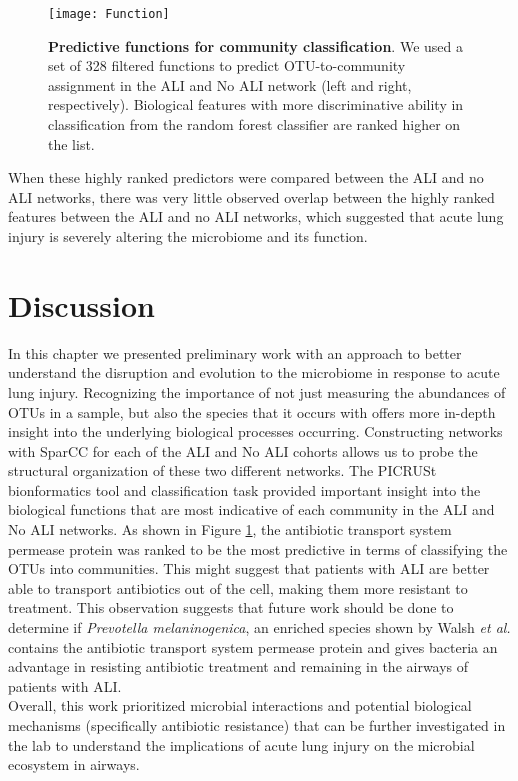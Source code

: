 \begin{figure}[h!]
\begin{center}
\texttt{[image: Function]}
\caption{{\bf Predictive functions for community classification}. We used a set of 328 filtered functions to predict OTU-to-community assignment in the ALI and No ALI network (left and right, respectively). Biological features with more discriminative ability in classification from the random forest classifier are ranked higher on the list.}
\label{Function}
\end{center}
\end{figure}

When these highly ranked predictors were compared between the ALI and no ALI networks, there was very little observed overlap between the highly ranked features between the ALI and no ALI networks, which suggested that acute lung injury is severely altering the microbiome and its function.

\section{Discussion}
\indent In this chapter we presented preliminary work with an approach to better understand the disruption and evolution to the microbiome in response to acute lung injury. Recognizing the importance of not just measuring the abundances of OTUs in a sample, but also the species that it occurs with offers more in-depth insight into the underlying biological processes occurring. Constructing networks with SparCC for each of the ALI and No ALI cohorts allows us to probe the structural organization of these two different networks. The PICRUSt bionformatics tool and classification task provided important insight into the biological functions that are most indicative of each community in the ALI and No ALI networks. As shown in Figure \ref{Function}, the antibiotic transport system permease protein was ranked to be the most predictive in terms of classifying the OTUs into communities. This might suggest that patients with ALI are better able to transport antibiotics out of the cell, making them more resistant to treatment. This observation suggests that future work should be done to determine if \emph{Prevotella melaninogenica}, an enriched species shown by Walsh \emph{et al.} contains the antibiotic transport system permease protein and gives bacteria an advantage in resisting antibiotic treatment and remaining  in the airways of patients with ALI. \\
\indent Overall, this work prioritized microbial interactions and potential biological mechanisms (specifically antibiotic resistance) that can be further investigated in the lab to understand the implications of acute lung injury on the microbial ecosystem in airways. 

